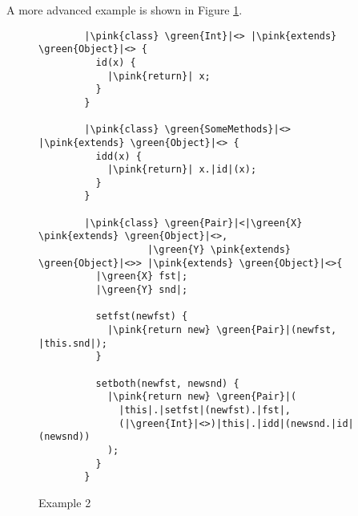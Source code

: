 A more advanced example is shown in Figure \ref{example2}.

\begin{figure}[tp]
    \begin{verbatim}
        |\pink{class} \green{Int}|<> |\pink{extends} \green{Object}|<> {
          id(x) {
            |\pink{return}| x;
          }
        }

        |\pink{class} \green{SomeMethods}|<> |\pink{extends} \green{Object}|<> {
          idd(x) {
            |\pink{return}| x.|id|(x);
          }
        }

        |\pink{class} \green{Pair}|<|\green{X} \pink{extends} \green{Object}|<>,
                   |\green{Y} \pink{extends} \green{Object}|<>> |\pink{extends} \green{Object}|<>{
          |\green{X} fst|;
          |\green{Y} snd|;

          setfst(newfst) {
            |\pink{return new} \green{Pair}|(newfst, |this.snd|);
          }

          setboth(newfst, newsnd) {
            |\pink{return new} \green{Pair}|(
              |this|.|setfst|(newfst).|fst|,
              (|\green{Int}|<>)|this|.|idd|(newsnd.|id|(newsnd))
            );
          }
        }
    \end{verbatim}
    \caption{Example 2}
    \label{example2}
\end{figure}

